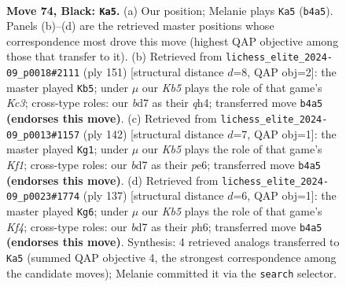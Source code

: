 \documentclass[11pt]{article}
\begin{document}
\clearpage

\begin{figure}[p]\centering
\begin{subfigure}{0.46\textwidth}\centering
\resizebox{\linewidth}{!}{%
\newchessgame
\chessboard[
  setfen={8/3B1P1R/8/8/1k6/8/5K1P/8 b - - 2 74},
  showmover=false,
  pgfstyle=straightmove, color=movearrow, markmove={b4-a5}
]}
\caption{}
\end{subfigure}\hfill
\begin{subfigure}{0.46\textwidth}\centering
\resizebox{\linewidth}{!}{%
\newchessgame
\chessboard[
  setfen={8/6K1/2k5/8/7Q/1P6/8/1R6 b - - 2 76},
  showmover=false,
  pgfstyle=straightmove, color=movearrow, markmove={c6-b5}
]}
\caption{}
\end{subfigure}
\\[4pt]
\begin{subfigure}{0.46\textwidth}\centering
\resizebox{\linewidth}{!}{%
\newchessgame
\chessboard[
  setfen={8/8/4p3/8/5k2/8/2pr4/5K2 w - - 0 72},
  showmover=false,
  pgfstyle=straightmove, color=movearrow, markmove={f1-g1}
]}
\caption{}
\end{subfigure}\hfill
\begin{subfigure}{0.46\textwidth}\centering
\resizebox{\linewidth}{!}{%
\newchessgame
\chessboard[
  setfen={8/1R6/7P/5k2/1P6/8/6PK/8 b - - 0 69},
  showmover=false,
  pgfstyle=straightmove, color=movearrow, markmove={f5-g6}
]}
\caption{}
\end{subfigure}
\caption{\textbf{Move 74, Black: \texttt{Ka5}.} (a) Our position; Melanie plays \texttt{Ka5} (\texttt{b4a5}). Panels (b)--(d) are the retrieved master positions whose correspondence most drove this move (highest QAP objective among those that transfer to it). (b) Retrieved from \texttt{lichess\_elite\_2024-09\_p0018\#2111} (ply 151) [structural distance $d$=8, QAP obj=2]: the master played \texttt{Kb5}; under $\mu$ our \emph{Kb5} plays the role of that game's \emph{Kc3}; cross-type roles: our \emph{b}d7 as their \emph{q}h4; transferred move \texttt{b4a5} \textbf{(endorses this move)}. (c) Retrieved from \texttt{lichess\_elite\_2024-09\_p0013\#1157} (ply 142) [structural distance $d$=7, QAP obj=1]: the master played \texttt{Kg1}; under $\mu$ our \emph{Kb5} plays the role of that game's \emph{Kf1}; cross-type roles: our \emph{b}d7 as their \emph{p}e6; transferred move \texttt{b4a5} \textbf{(endorses this move)}. (d) Retrieved from \texttt{lichess\_elite\_2024-09\_p0023\#1774} (ply 137) [structural distance $d$=6, QAP obj=1]: the master played \texttt{Kg6}; under $\mu$ our \emph{Kb5} plays the role of that game's \emph{Kf4}; cross-type roles: our \emph{b}d7 as their \emph{p}h6; transferred move \texttt{b4a5} \textbf{(endorses this move)}. Synthesis: 4 retrieved analogs transferred to \texttt{Ka5} (summed QAP objective 4, the strongest correspondence among the candidate moves); Melanie committed it via the \texttt{search} selector.}
\label{fig:thought-m147}
\end{figure}
\end{document}
